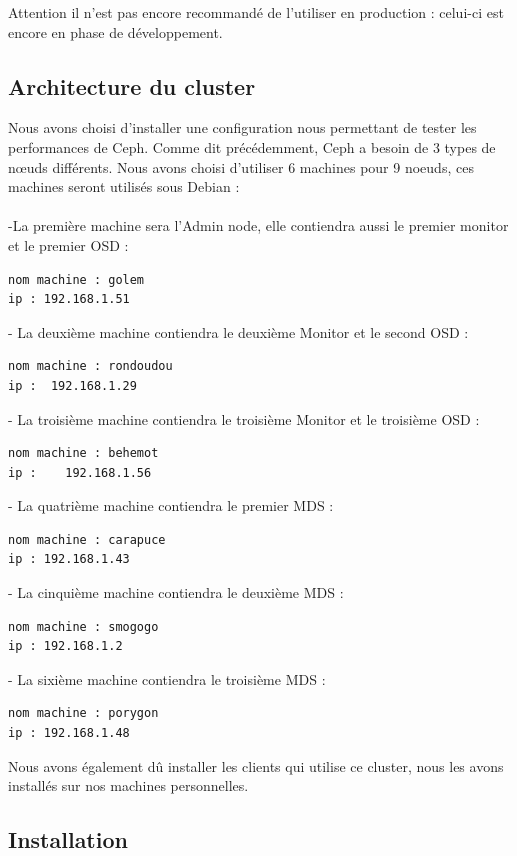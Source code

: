\documentclass[12pt]{article}
\begin{document}
Attention il n'est pas encore recommandé de l'utiliser en production : celui-ci est encore en phase de développement.
\newpage
	\subsection{Architecture du cluster}
	Nous avons choisi d'installer une configuration nous permettant de tester les performances de Ceph. Comme dit précédemment, Ceph a besoin de 3 types de nœuds différents. Nous avons choisi d'utiliser 6 machines pour 9 noeuds, ces machines seront utilisés sous Debian :
\\\\-La première machine sera l'Admin node, elle contiendra aussi le premier monitor et le premier OSD :
\begin{verbatim}
nom machine : golem
ip : 192.168.1.51
\end{verbatim}

- La deuxième machine contiendra le deuxième Monitor et le second OSD :
\begin{verbatim}
nom machine : rondoudou 
ip :  192.168.1.29
\end{verbatim}

- La troisième machine contiendra le troisième Monitor et le troisième OSD :
\begin{verbatim}
nom machine : behemot
ip :    192.168.1.56
\end{verbatim}

- La quatrième machine contiendra le premier MDS :
\begin{verbatim}
nom machine : carapuce 
ip : 192.168.1.43
\end{verbatim}

- La cinquième machine contiendra le deuxième MDS :
\begin{verbatim}
nom machine : smogogo
ip : 192.168.1.2
\end{verbatim}

- La sixième machine contiendra le troisième MDS :
\begin{verbatim}
nom machine : porygon
ip : 192.168.1.48
\end{verbatim}

Nous avons également dû installer les clients qui utilise ce cluster, nous les avons installés sur nos machines personnelles.

	\subsection{Installation}
	
\end{document}
